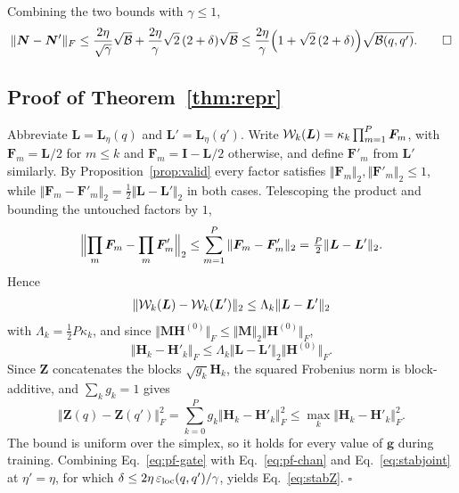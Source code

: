Combining the two bounds with $\gamma\le1$,
\[
\|\bm N-\bm N'\|_F\le\frac{2\eta}{\sqrt\gamma}\sqrt{\mathcal B}+\frac{2\eta}{\gamma}\sqrt2\,(2+\delta)\sqrt{\mathcal B}
\le\frac{2\eta}{\gamma}\Bigl(1+\sqrt2\,(2+\delta)\Bigr)\sqrt{\mathcal B(q,q')}.
\tag*{$\square$}
\]

\subsection{Proof of Theorem~\ref{thm:repr}}
Abbreviate $\bm L=\bm L_\eta(q)$ and $\bm L'=\bm L_\eta(q')$.
Write $\mathcal{W}_k(\bm L)=\kappa_k\prod_{m=1}^{P}\bm F_m$, with
$\bm F_m=\bm L/2$ for $m\le k$ and $\bm F_m=\bm I-\bm L/2$ otherwise, and define $\bm F'_m$ from $\bm L'$ similarly.
By Proposition~\ref{prop:valid} every factor satisfies
$\Vert\bm F_m\Vert_2,\Vert\bm F'_m\Vert_2\le1$, while
$\Vert\bm F_m-\bm F'_m\Vert_2=\tfrac12\Vert\bm L-\bm L'\Vert_2$ in both cases.
Telescoping the product and bounding the untouched factors by $1$,
\begin{equation}
\Bigl\Vert\prod_m\bm F_m-\prod_m\bm F'_m\Bigr\Vert_2
\le\sum_{m=1}^{P}\Vert\bm F_m-\bm F'_m\Vert_2
=\tfrac{P}{2}\Vert\bm L-\bm L'\Vert_2.
\label{eq:pf-prod}
\end{equation}
Hence
\begin{equation}
\Vert\mathcal{W}_k(\bm L)-\mathcal{W}_k(\bm L')\Vert_2\le\Lambda_k\Vert\bm L-\bm L'\Vert_2
\label{eq:pf-kernel}
\end{equation}
with $\Lambda_k=\tfrac12P\kappa_k$, and since
$\Vert\bm M\bm H^{(0)}\Vert_F\le\Vert\bm M\Vert_2\Vert\bm H^{(0)}\Vert_F$,
\begin{equation}
\Vert\bm H_k-\bm H'_k\Vert_F
\le\Lambda_k\Vert\bm L-\bm L'\Vert_2\Vert\bm H^{(0)}\Vert_F.
\label{eq:pf-chan}
\end{equation}
Since $\bm Z$ concatenates the blocks $\sqrt{g_k}\bm H_k$, the
squared Frobenius norm is block-additive, and $\sum_kg_k=1$ gives
\begin{equation}
\Vert\bm Z(q)-\bm Z(q')\Vert_F^2
=\sum_{k=0}^{P}g_k\Vert\bm H_k-\bm H'_k\Vert_F^2
\le\max_k\Vert\bm H_k-\bm H'_k\Vert_F^2.
\label{eq:pf-gate}
\end{equation}
The bound is uniform over the simplex, so it holds for every value of $\bm g$ during training.
Combining Eq.~\eqref{eq:pf-gate} with Eq.~\eqref{eq:pf-chan} and Eq.~\eqref{eq:stabjoint} at $\eta'=\eta$, for which $\delta\le2\eta\,\varepsilon_{\mathrm{loc}}(q,q')/\gamma$, yields Eq.~\eqref{eq:stabZ}.
\hfill$\square$

